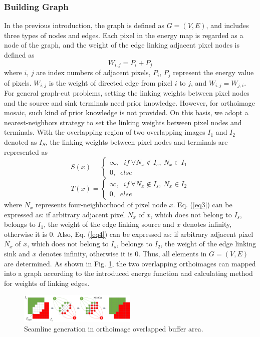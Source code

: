 \documentclass[journal]{IEEEtran}
\begin{document}
\subsubsection{Building Graph}
In the previous introduction, the graph is defined as $G=\left(V, E \right)$, and includes three types of nodes and edges. Each pixel in the energy map is regarded as a node of the graph, and the weight of the edge linking adjacent pixel nodes is defined as
\begin{equation}\label{eq2}
W_{i,j}=P_{i}+P_{j}
\end{equation}
where $i$, $j$ are index numbers of adjacent pixels, $P_i$, $P_j$ represent the energy value of pixels. $W_{i,j}$ is the weight of directed edge from pixel $i$ to $j$, and $W_{i,j}=W_{j,i}$. For general graph-cut problems, setting the linking weights between pixel nodes and the source and sink terminals need prior knowledge. However, for orthoimage mosaic, such kind of prior knowledge is not provided. On this basis, we adopt a nearest-neighbors strategy to set the linking weights between pixel nodes and terminals. With the overlapping region of two overlapping images $I_1$ and $I_2$ denoted as $I_S$, the linking weights between pixel nodes and terminals are represented as
\begin{equation}\label{eq3}
S(x)= \left\{ {\begin{array}{*{20}{c}}
	{\infty,\;\;if~\forall N_{x}\notin I_{s},~N_{x}\in I_{1}}\\
	{0 ,\;\;else}
	\end{array}} \right.
\end{equation}
\begin{equation}\label{eq4}
T(x)= \left\{ {\begin{array}{*{20}{c}}
	{\infty,\;\;if~\forall N_{x}\notin I_{s},~N_{x}\in I_{2}}\\
	{0 ,\;\;else}
	\end{array}} \right.
\end{equation}
where $N_x$ represents four-neighborhood of pixel node $x$. Eq. (\ref{eq3}) can be expressed as: if arbitrary adjacent pixel $N_x$ of $x$, which does not belong to $I_s$, belongs to $I_1$, the weight of the edge linking source and $x$ denotes infinity, otherwise it is 0. Also, Eq. (\ref{eq4}) can be expressed as: if arbitrary adjacent pixel $N_x$ of $x$, which does not belong to $I_s$, belongs to $I_2$, the weight of the edge linking sink and $x$ denotes infinity, otherwise it is 0. Thus, all elements in $G= (V, E)$ are determined. As shown in Fig. \ref{fig:link}, the two overlapping orthoimages can mapped into a graph according to the introduced energe function and calculating method for weights of linking edges.
\begin{figure}[!t]
	\centering
	\includegraphics[width=0.5\textwidth]{link}
	\caption{Seamline generation in orthoimage overlapped buffer area.}
	\label{fig:link}
\end{figure}
\end{document}
